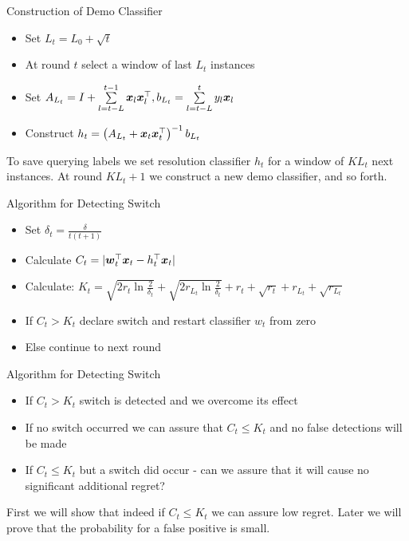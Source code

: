\documentclass{beamer}
\begin{document}
\begin{frame}{Construction of Demo Classifier}
\begin{itemize}
\item Set $L_t=L_0+\sqrt{t}$
\item At round $t$  select a window of last $L_t$ instances 
\item Set $A_{L_t}=I+\sum\limits_{l=t-L}^{t-1}{{\boldsymbol{x}}_{l}{{\boldsymbol{x}}}^{\top}_{l}}, b_{L_t}=\sum\limits_{l=t-L}^{t}y_l{\boldsymbol{x}}_{l}$
\item Construct $h_t=\left(A_{L_t}+{\boldsymbol{x}}_{t}{{\boldsymbol{x}}}^{\top}_{t}\right)^{-1}b_{L_t}$
\end{itemize}
To save querying labels we set resolution classifier $h_t$ for a window of $KL_t$ next instances. At round $KL_t+1$ we construct a new demo classifier, and so forth.
\end{frame}

\begin{frame}{Algorithm for Detecting Switch}
\begin{itemize}
\item Set $\delta_t=\frac{\delta}{t(t+1)}$
\item Calculate $C_t=\vert{{\boldsymbol{w}}}^{\top}_{t}{\boldsymbol{x}}_{t}-h_{t}^{\top}{\boldsymbol{x}}_{t}\vert$
\item Calculate: \newline \newline $K_t=\sqrt{2r_t\ln{\frac{2}{\delta_t}}}+\sqrt{2r_{L_t}\ln{\frac{2}{\delta_t}}}+r_t+\sqrt{r_t}+r_{L_t}+\sqrt{r_{L_t}}$
\item If $C_t>K_t$ declare switch and restart classifier $w_t$ from zero
\item Else continue to next round
\end{itemize}
\end{frame}


\begin{frame}{Algorithm for Detecting Switch}
\begin{itemize}
\item If $C_t>K_t$ switch is detected and we overcome its effect
\item If no switch occurred we can assure that $C_t\leq K_t$ and no false detections will be made
\item If $C_t\leq K_t$ but a switch did occur - can we assure that it will cause no significant additional regret?
\end{itemize}
First we will show that indeed if $C_t\leq K_t$ we can assure low regret.\newline
Later we will prove that the probability for a false positive is small.
\end{frame}
\end{document}
